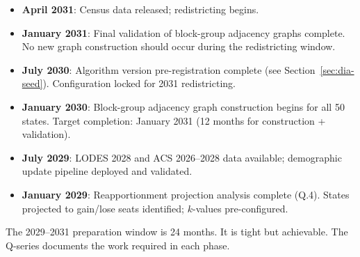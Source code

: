 \begin{itemize}
\item \textbf{April 2031}: Census data released; redistricting begins.
\item \textbf{January 2031}: Final validation of block-group adjacency graphs complete.
  No new graph construction should occur during the redistricting window.
\item \textbf{July 2030}: Algorithm version pre-registration complete (see Section~\ref{sec:dia-seed}).
  Configuration locked for 2031 redistricting.
\item \textbf{January 2030}: Block-group adjacency graph construction begins for all 50 states.
  Target completion: January 2031 (12 months for construction + validation).
\item \textbf{July 2029}: LODES 2028 and ACS 2026--2028 data available; demographic update
  pipeline deployed and validated.
\item \textbf{January 2029}: Reapportionment projection analysis complete (Q.4).
  States projected to gain/lose seats identified; $k$-values pre-configured.
\end{itemize}

The 2029--2031 preparation window is 24 months. It is tight but achievable.
The Q-series documents the work required in each phase.
